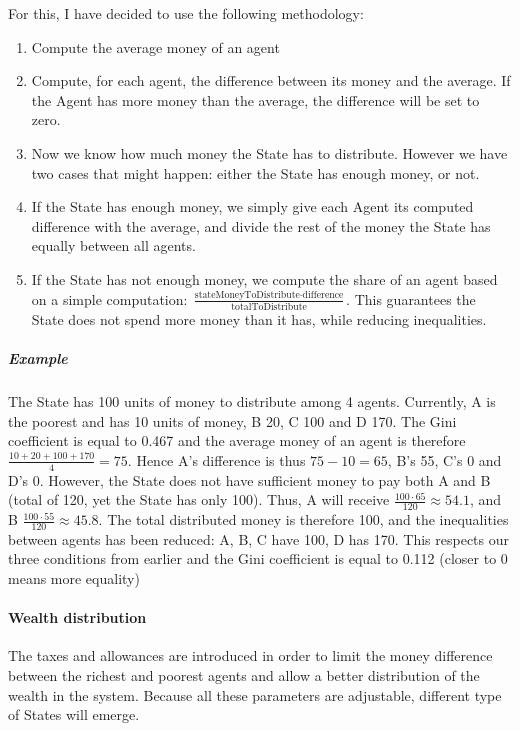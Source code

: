                 For this, I have decided to use the following methodology:

                \begin{enumerate}
                    \item Compute the average money of an agent
                    \item Compute, for each agent, the difference between its money and the average. If the Agent has more money than the average, the difference will be set to zero.
                    \item Now we know how much money the State has to distribute. However we have two cases that might happen: either the State has enough money, or not.
                    \item If the State has enough money, we simply give each Agent its computed difference with the average, and divide the rest of the money the State has equally between all agents.
                    \item If the State has not enough money, we compute the share of an agent based on a simple computation: $\frac{\text{stateMoneyToDistribute} \cdot \text{difference}}{\text{totalToDistribute}}$. This guarantees the State does not spend more money than it has, while reducing inequalities.
                \end{enumerate}

                \subparagraph{Example}
                The State has 100 units of money to distribute among 4 agents. Currently, A is the poorest and has 10 units of money, B 20, C 100 and D 170. The Gini coefficient is equal to 0.467 and the average money of an agent is therefore $\frac{10 + 20 + 100 + 170}{4} = 75$. Hence A's difference is thus $75-10=65$, B's 55, C's 0 and D's 0. However, the State does not have sufficient money to pay both A and B (total of 120, yet the State has only 100). Thus, A will receive $\frac{100 \cdot 65}{120} \approx 54.1$, and B $\frac{100 \cdot 55}{120} \approx 45.8$. The total distributed money is therefore 100, and the inequalities between agents has been reduced: A, B, C have 100, D has 170. This respects our three conditions from earlier and the Gini coefficient is equal to 0.112 (closer to 0 means more equality)


        \paragraph{Wealth distribution}
        The taxes and allowances are introduced in order to limit the money difference between the richest and poorest agents and allow a better distribution of the wealth in the system. Because all these parameters are adjustable, different type of States will emerge.

